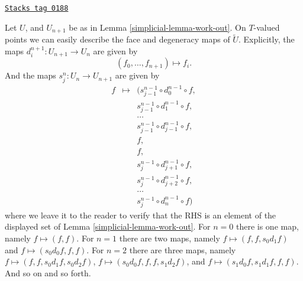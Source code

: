 \begin{remark}
\label{simplicial-remark-explicit-face-degeneracy}
\href{https://stacks.math.columbia.edu/tag/0188}{\texttt{Stacks tag 0188}}

Let $U$, and $U_{n + 1}$ be as in Lemma \ref{simplicial-lemma-work-out}.
On $T$-valued points we can easily describe the face
and degeneracy maps of $\tilde U$.
Explicitly, the maps $d^{n + 1}_i : U_{n + 1} \to U_n$
are given by
$$
(f_0, \ldots, f_{n + 1}) \longmapsto f_i.
$$
And the maps $s^n_j : U_n \to U_{n + 1}$ are given by
\begin{eqnarray*}
f & \longmapsto & (
s^{n - 1}_{j - 1} \circ d^{n - 1}_0 \circ f, \\
& &
s^{n - 1}_{j - 1} \circ d^{n - 1}_1 \circ f, \\
& &
\ldots\\
& &
s^{n - 1}_{j - 1} \circ d^{n - 1}_{j - 1} \circ f, \\
& &
f, \\
& &
f, \\
& &
s^{n - 1}_j \circ d^{n - 1}_{j + 1} \circ f, \\
& &
s^{n - 1}_j \circ d^{n - 1}_{j + 2} \circ f, \\
& &
\ldots\\
& &
s^{n - 1}_j \circ d^{n - 1}_n \circ f
)
\end{eqnarray*}
where we leave it to the reader to verify that the RHS
is an element of the displayed set of Lemma \ref{simplicial-lemma-work-out}.
For $n = 0$ there is one map, namely $f \mapsto (f, f)$.
For $n = 1$ there are two maps, namely
$f \mapsto (f, f, s_0d_1f)$ and
$f \mapsto (s_0d_0f, f, f)$.
For $n = 2$ there are three maps, namely
$f \mapsto (f, f, s_0d_1f, s_0d_2f)$,
$f \mapsto (s_0d_0f, f, f, s_1d_2f)$, and
$f \mapsto (s_1d_0f, s_1d_1f, f, f)$.
And so on and so forth.
\end{remark}

